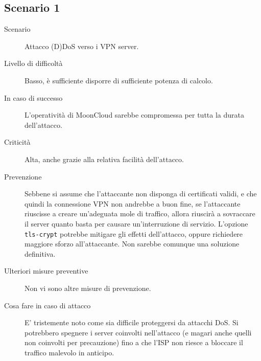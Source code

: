 
\subsection{Scenario 1}
\begin{description}
    \item[Scenario]Attacco (D)DoS verso i VPN server.
    \item[Livello di difficoltà]Basso, è sufficiente disporre
    di sufficiente potenza di calcolo. 
    \item[In caso di successo]L'operatività di MoonCloud sarebbe
    compromessa per tutta la durata dell'attacco. 
    \item[Criticità]Alta, anche grazie alla relativa facilità dell'attacco.
    \item[Prevenzione]Sebbene si assume che l'attaccante non disponga di
    certificati validi, e che quindi la connessione VPN non andrebbe a buon
    fine, se l'attaccante riuscisse a creare un'adeguata mole di
    traffico, allora riuscirà a sovraccare il server quanto basta
    per causare un'interruzione di servizio.
    L'opzione \texttt{tls-crypt} potrebbe mitigare gli effetti dell'attacco,
    oppure richiedere maggiore sforzo all'attaccante. Non sarebbe
    comunque una soluzione definitiva.
    \item[Ulteriori misure preventive]Non vi sono altre misure di prevenzione. 
    \item[Cosa fare in caso di attacco]E' tristemente noto come sia
    difficile proteggersi da attacchi DoS. Si potrebbero spegnere
    i server coinvolti nell'attacco (e magari anche quelli non
    coinvolti per precauzione) fino a che l'ISP non riesce
    a bloccare il traffico malevolo in anticipo.
\end{description}

